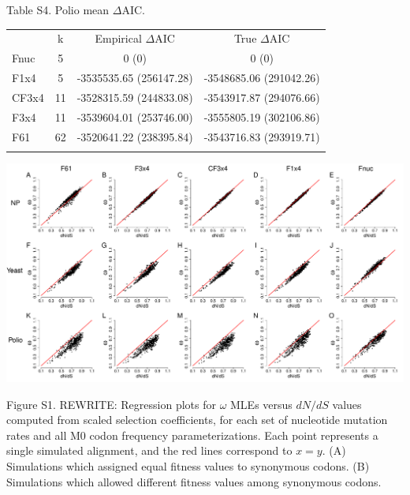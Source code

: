 \documentclass{pnastwo}
\begin{document}
\vspace{2cm}

\noindent Table S4. Polio mean $\Delta$AIC.
\begin{table}[htbp]
	\begin{tabular}{l c c c}
		\hline\noalign{\smallskip}
		\multicolumn{1}{c}{Frequencies} & k & Empirical $\Delta$AIC & True $\Delta$AIC \\
		\noalign{\smallskip}\hline\noalign{\smallskip}
		Fnuc & 5 & 0 (0)  & 0 (0)  \\ 
		F1x4 & 5 & -3535535.65 (256147.28)  & -3548685.06 (291042.26)  \\ 
		CF3x4 & 11 & -3528315.59 (244833.08)  & -3543917.87 (294076.66)  \\ 
		F3x4 & 11 & -3539604.01 (253746.00)  & -3555805.19 (302106.86)  \\ 
		F61 & 62 & -3520641.22 (238395.84)  & -3543716.83 (293919.71)  \\ 
		\noalign{\smallskip}\hline\noalign{\smallskip} 
	\end{tabular}
\end{table}


\newpage

\begin{landscape}
\includegraphics[width=9in]{figures/SI/nyp_datafreqs.pdf}
\vspace{0.5cm}

\noindent Figure S1. REWRITE: Regression plots for $\omega$ MLEs versus $dN/dS$ values computed from scaled selection coefficients, for each set of nucleotide mutation rates and all M0 codon frequency parameterizations. Each point represents a single simulated alignment, and the red lines correspond to $x=y$. (A) Simulations which assigned equal fitness values to synonymous codons. (B) Simulations which allowed different fitness values among synonymous codons.
\end{landscape}
\end{document}
